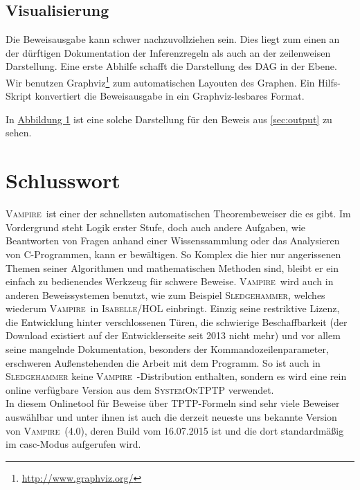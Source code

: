 \documentclass{article}
\newcommand{\vampire}{\textsc{Vampire}~}
\begin{document}
\subsection{Visualisierung}
\label{subsec:outputvis}

Die Beweisausgabe kann schwer nachzuvollziehen sein. Dies liegt zum einen 
an der dürftigen Dokumentation der Inferenzregeln \cite{blanchettemy} als auch an der zeilenweisen Darstellung.
Eine erste Abhilfe schafft die Darstellung des DAG in der Ebene. 
Wir benutzen Graphviz\footnote{\url {http://www.graphviz.org/}} zum automatischen Layouten
des Graphen. Ein Hilfs-Skript konvertiert die Beweisausgabe in ein Graphviz-lesbares Format.

In \hyperref[fig:pytripleproof]{Abbildung 1} ist eine solche Darstellung für den Beweis aus \ref{sec:output} 
zu sehen.





\section{Schlusswort}
\label{sec:conclusion}
\vampire ist einer der schnellsten automatischen Theorembeweiser die es gibt. Im Vordergrund steht Logik erster Stufe, doch auch andere Aufgaben, wie Beantworten von Fragen anhand einer Wissenssammlung oder das Analysieren von C-Programmen, kann er bewältigen. So Komplex die hier nur angerissenen Themen seiner Algorithmen und mathematischen Methoden sind, bleibt er ein einfach zu bedienendes Werkzeug für schwere Beweise. 
\vampire wird auch in anderen Beweissystemen benutzt, wie zum Beispiel \textsc{Sledgehammer}, welches wiederum \vampire in  \textsc{Isabelle/HOL} einbringt.
Einzig seine restriktive Lizenz, die Entwicklung hinter verschlossenen Türen, die schwierige Beschaffbarkeit (der Download existiert auf der Entwicklerseite seit 2013 nicht mehr) und vor allem seine mangelnde Dokumentation, besonders der Kommandozeilenparameter, erschweren Außenstehenden die Arbeit mit dem Programm.
So ist auch in \textsc{Sledgehammer} keine \vampire-Distribution enthalten, sondern es wird eine rein online verfügbare Version aus dem \textsc{SystemOnTPTP} \cite{systemOnTPTP} verwendet. \cite[S. 1-3]{blanchettemy} \\In diesem Onlinetool für Beweise über TPTP-Formeln sind sehr viele Beweiser auswählbar und unter ihnen ist auch die derzeit neueste uns bekannte Version von \vampire (4.0), deren Build vom 16.07.2015 ist und die dort standardmäßig im casc-Modus aufgerufen wird.
\end{document}
